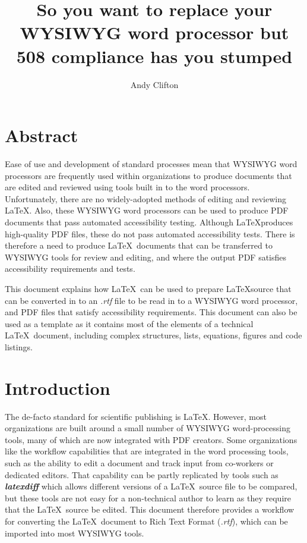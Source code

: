 \documentclass[12pt,letterpaper]{article}
\author{Andy Clifton}
\title{So you want to replace your WYSIWYG word processor but 508 compliance has you stumped}
\newcommand{\fn}[1]{\emph{#1}}
\newcommand{\packagename}[1]{\textbf{\emph{#1}}}
\begin{document}
\maketitle
  
\section*{Abstract}
Ease of use and development of standard processes mean that WYSIWYG word processors are frequently used within organizations to produce documents that are edited and reviewed using tools built in to the word processors. Unfortunately, there are no widely-adopted methods of editing and reviewing \LaTeX. Also, these WYSIWYG word processors can be used to produce PDF documents that pass automated accessibility testing. Although \LaTeX produces high-quality PDF files, these do not pass automated accessibility tests. There is therefore a need to produce \LaTeX\ documents that can be transferred to WYSIWYG tools for review and editing, and where the output PDF satisfies accessibility requirements and tests. 

This document explains how \LaTeX\ can be used to prepare \LaTeX source that can be converted in to an \fn{.rtf} file to be read in to a WYSIWYG word processor, and PDF files that satisfy accessibility requirements. This document can also be used as a template as it contains most of the elements of a technical \LaTeX\ document, including complex structures, lists, equations, figures and code listings.

\renewcommand{\contentsname}{Table of Contents}
\tableofcontents
\listoffigures
\listoftables
{}

\section{Introduction}
The de-facto standard for scientific publishing is \LaTeX. However, most organizations are built around a small number of WYSIWYG word-processing tools, many of which are now integrated with PDF creators. Some organizations like the workflow capabilities that are integrated in the word processing tools, such as the ability to edit a document and track input from co-workers or dedicated editors. That capability can be partly replicated by tools such as \packagename{latexdiff} which allows different versions of a \LaTeX\ source file to be compared, but these tools are not easy for a non-technical author to learn as they require that the \LaTeX\ source be edited. This document therefore provides a workflow for converting the \LaTeX\ document to Rich Text Format (\fn{.rtf}), which can be imported into most WYSIWYG tools.
\end{document}
